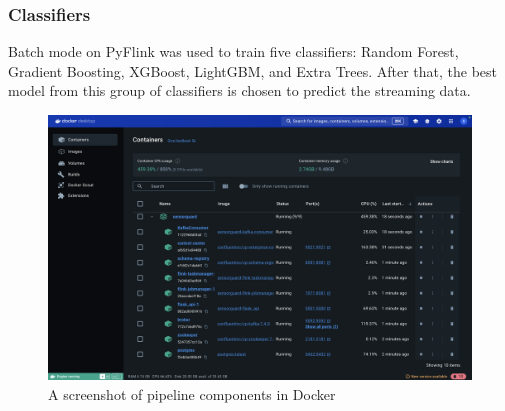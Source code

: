 \documentclass[runningheads]{llncs}
\begin{document}
\subsubsection{Classifiers}
Batch mode on PyFlink was used to train five classifiers: Random Forest, Gradient Boosting, XGBoost, LightGBM, and Extra Trees. After that, the best model from this group of classifiers is chosen to predict the streaming data. 

\begin{figure}[htbp]
\centerline{\includegraphics[width=\linewidth]{images/docker-compose.png}}
\caption{A screenshot of pipeline components in Docker}
\label{fig:docker-compose}
\end{figure}


            
\end{document}
